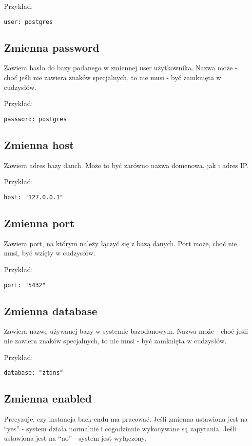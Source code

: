 \documentclass{hitec}
\begin{document}
\begin{sloppypar}
Przykład:
\begin{verbatim}
user: postgres
\end{verbatim}

\subsection{Zmienna password}
Zawiera hasło do bazy podanego w zmiennej user użytkownika. Nazwa może - choć
jeśli nie zawiera znaków specjalnych, to nie musi - być zamknięta w cudzysłów.

Przykład:
\begin{verbatim}
password: postgres
\end{verbatim}

\subsection{Zmienna host}
Zawiera adres bazy danch. Może to być zarówno nazwa domenowa, jak i adres IP.

Przykład:
\begin{verbatim}
host: "127.0.0.1"
\end{verbatim}

\subsection{Zmienna port}
Zawiera port, na którym należy łączyć się z bazą danych. Port może, choć nie
musi, być wzięty w cudzysłów.

Przykład:
\begin{verbatim}
port: "5432"
\end{verbatim}

\subsection{Zmienna database}
Zawiera nazwę używanej bazy w systemie bazodanowym. Nazwa może - choć jeśli nie
zawiera znaków specjalnych, to nie musi - być zamknięta w cudzysłów.

Przykład:
\begin{verbatim}
database: "ztdns"
\end{verbatim}

\subsection{Zmienna enabled}
Precyzuje, czy instancja back-endu ma pracować. Jeśli zmienna ustawiona jest na
``yes'' - system działa normalnie i cogodzinnie wykonywane są zapytania. Jeśli
ustawiona jest na ``no'' - system jest wyłączony.


\end{sloppypar}
\end{document}
